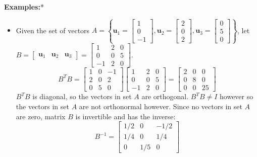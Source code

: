\documentclass{article}
\begin{document}
\textbf{Examples:}*
\begin{itemize}
\item Given the set of vectors \(A = \left\{\mathbf{u}_1 = \begin{bmatrix} 1 \\ 0 \\ -1 \end{bmatrix}, \mathbf{u}_2 = \begin{bmatrix} 2 \\ 0 \\ 2 \end{bmatrix}, \mathbf{u}_3 = \begin{bmatrix} 0 \\ 5 \\ 0 \end{bmatrix}\right\}\), let \(B = \begin{bmatrix} \mathbf{u}_1 & \mathbf{u}_2 & \mathbf{u}_3 \end{bmatrix} = \begin{bmatrix} 1 & 2 & 0 \\ 0 & 0 & 5 \\ -1 & 2 & 0 \end{bmatrix}\). 
\[B^T B = \begin{bmatrix} 1 & 0 & -1 \\ 2 & 0 & 2 \\ 0 & 5 & 0 \end{bmatrix}\begin{bmatrix} 1 & 2 & 0 \\ 0 & 0 & 5 \\ -1 & 2 & 0 \end{bmatrix} = \begin{bmatrix} 2 & 0 & 0 \\ 0 & 8 & 0 \\ 0 & 0 & 25 \end{bmatrix}\]
\(B^T B\) is diagonal, so the vectors in set \(A\) are orthogonal. \(B^T B \neq I\) however so the vectors in set \(A\) are not orthonormal however. Since no vectors in set \(A\) are zero, matrix \(B\) is invertible and has the inverse:
\[B^{-1} = \begin{bmatrix} 1/2 & 0 & -1/2 \\ 1/4 & 0 & 1/4 \\ 0 & 1/5 & 0 \end{bmatrix}\]

\end{itemize}
\end{document}
